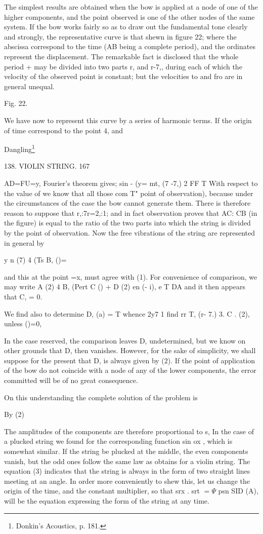 The simplest results are obtained when the bow is applied at a node of one of
the higher components, and the point observed is one of the other nodes of the
same system. If the bow works fairly so as to draw out the fundamental tone
clearly and strongly, the representative curve is that shewn in figure 22;
where the abscissa correspond to the time (AB being a complete period), and the
ordinates represent the displacement. The remarkable fact is disclosed that the
whole period + may be divided into two parts r, and r-7,, during each of which
the velocity of the observed point is constant; but the velocities to and fro
are in general unequal.

Fig. 22.

We have now to represent this curve by a series of harmonic terms. If the
origin of time correspond to the point 4, and

Dangling\footnote{ Donkin's Acoustics, p. 181.}

138. VIOLIN STRING. 167

AD=FU=y, Fourier's theorem gives; sin - (y= mt, (7 -7,) 2 FF T With respect to
the value of we know that all those com T" point of observation), because under
the circumstances of the case the bow cannot generate them. There is therefore
reason to suppose that r,:7r=2,:1; and in fact observation proves that AC: CB
(in the figure) is equal to the ratio of the two parts into which the string is
divided by the point of observation. Now the free vibrations of the string are
represented in general by

y n (7) 4 (Ts B, ()=

and this at the point =x, must agree with (1). For convenience of comparison,
we may write A (2) 4 B, (Pert C () + D (2) en (- i), e T DA and it then appears
that C, = 0.

We find also to determine D, (a) = T whence 2y7 1 find rr T, (r- 7.) 3.  C .
(2), unless ()=0,

In the case reserved, the comparison leaves D, undetermined, but we know on
other grounds that D, then vanishes. However, for the sake of simplicity, we
shall suppose for the present that D, is always given by (2). If the point of
application of the bow do not coincide with a node of any of the lower
components, the error committed will be of no great consequence.

On this understanding the complete solution of the problem is

By (2)

The amplitudes of the components are therefore proportional to s, In the case
of a plucked string we found for the corresponding function sin ox , which is
somewhat similar. If the string be plucked at the middle, the even components
vanish, but the odd ones follow the same law as obtains for a violin string.
The equation (3) indicates that the string is always in the form of two
straight lines meeting at an angle. In order more conveniently to shew this,
let us change the origin of the time, and the constant multiplier, so that srx
. srt \(= \Psi\) psn SID (A), will be the equation expressing the form of the string
at any time.

